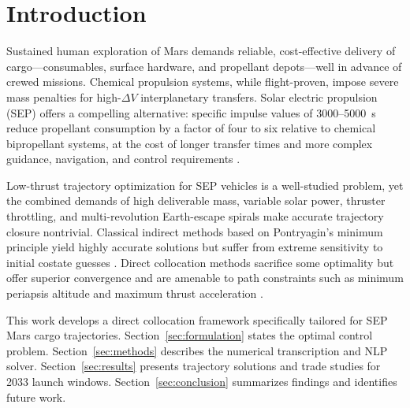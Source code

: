 \section{Introduction}
\label{sec:intro}

Sustained human exploration of Mars demands reliable, cost-effective delivery
of cargo—consumables, surface hardware, and propellant depots—well in advance
of crewed missions.  Chemical propulsion systems, while flight-proven, impose
severe mass penalties for high-$\Delta V$ interplanetary transfers.  Solar
electric propulsion (SEP) offers a compelling alternative: specific impulse
values of 3000–5000~s reduce propellant consumption by a factor of four to
six relative to chemical bipropellant systems, at the cost of longer transfer
times and more complex guidance, navigation, and control requirements
\cite{raghavendra2019,brophy2012}.

Low-thrust trajectory optimization for SEP vehicles is a well-studied problem,
yet the combined demands of high deliverable mass, variable solar power,
thruster throttling, and multi-revolution Earth-escape spirals make accurate
trajectory closure nontrivial.  Classical indirect methods based on Pontryagin's
minimum principle yield highly accurate solutions but suffer from extreme
sensitivity to initial costate guesses \cite{bryson1975}.  Direct collocation
methods sacrifice some optimality but offer superior convergence and are
amenable to path constraints such as minimum periapsis altitude and maximum
thrust acceleration \cite{betts1998,longuski2014}.

This work develops a direct collocation framework specifically tailored for
SEP Mars cargo trajectories.  Section~\ref{sec:formulation} states the
optimal control problem.  Section~\ref{sec:methods} describes the numerical
transcription and NLP solver.  Section~\ref{sec:results} presents trajectory
solutions and trade studies for 2033 launch windows.  Section~\ref{sec:conclusion}
summarizes findings and identifies future work.

